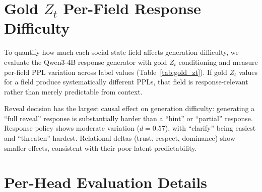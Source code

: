 \documentclass[11pt]{article}
\begin{document}
\section{Gold $Z_t$ Per-Field Response Difficulty}
\label{app:gold_zt_bridge}

To quantify how much each social-state field affects generation difficulty, we evaluate the Qwen3-4B response generator with gold $Z_t$ conditioning and measure per-field PPL variation across label values (Table~\ref{tab:gold_zt}).
If gold $Z_t$ values for a field produce systematically different PPLs, that field is response-relevant rather than merely predictable from context.

\begin{table}[h]
\centering
\caption{Gold $Z_t$ per-field response PPL variation ($n=500$ examples). Effect size is Cohen's $d$ across label values.}
\label{tab:gold_zt}
\small
{}
\end{table}

Reveal decision has the largest causal effect on generation difficulty: generating a ``full reveal'' response is substantially harder than a ``hint'' or ``partial'' response.
Response policy shows moderate variation ($d{=}0.57$), with ``clarify'' being easiest and ``threaten'' hardest.
Relational deltas (trust, respect, dominance) show smaller effects, consistent with their poor latent predictability.

\section{Per-Head Evaluation Details}
\label{app:perhead}
\end{document}

